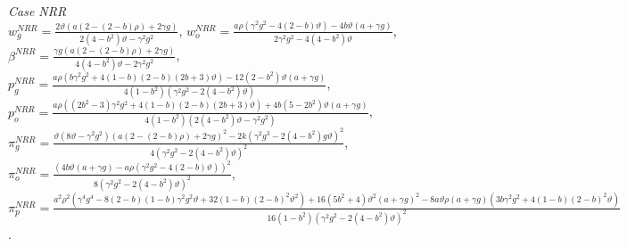 \documentclass[preprint,review,12pt,authoryear,nopreprintline]{elsarticle}
\theoremstyle{definition}
\begin{document}
\noindent\textit{Case NRR}\\
$w_g^{NRR}=\frac{2 \vartheta  (a (2-(2-b) \rho )+2 \gamma  g)}{2 \left(4-b^2\right) \vartheta -\gamma ^2 g^2}$,
$w_o^{NRR}=\frac{a \rho  \left(\gamma ^2 g^2-4 (2-b) \vartheta \right)-4 b \vartheta  (a+\gamma  g)}{2 \gamma ^2 g^2-4 \left(4-b^2\right) \vartheta }$,
$\beta^{NRR}=\frac{\gamma  g (a (2-(2-b) \rho )+2 \gamma  g)}{4 \left(4-b^2\right) \vartheta -2 \gamma ^2 g^2}$,\\
$p_g^{NRR}=\frac{a \rho  \left(b \gamma ^2 g^2+4 (1-b) (2-b) (2 b+3) \vartheta \right)-12 \left(2-b^2\right) \vartheta  (a+\gamma  g)}{4 \left(1-b^2\right) \left(\gamma ^2 g^2-2 \left(4-b^2\right) \vartheta \right)}$,\\
$p_o^{NRR}=\frac{a \rho  \left(\left(2 b^2-3\right) \gamma ^2 g^2+4 (1-b) (2-b) (2 b+3) \vartheta \right)+4 b \left(5-2 b^2\right) \vartheta  (a+\gamma  g)}{4 \left(1-b^2\right) \left(2 \left(4-b^2\right) \vartheta -\gamma ^2 g^2\right)}$,\\
$\pi_g^{NRR}=\frac{\vartheta  \left(8 \vartheta -\gamma ^2 g^2\right) (a (2-(2-b) \rho )+2 \gamma  g)^2-2 k \left(\gamma ^2 g^3-2 \left(4-b^2\right) g \vartheta \right)^2}{4 \left(\gamma ^2 g^2-2 \left(4-b^2\right) \vartheta \right)^2}$,
$\pi_o^{NRR}=\frac{\left(4 b \vartheta  (a+\gamma  g)-a \rho  \left(\gamma ^2 g^2-4 (2-b) \vartheta \right)\right)^2}{8 \left(\gamma ^2 g^2-2 \left(4-b^2\right) \vartheta \right)^2}$,\\
$\pi_p^{NRR}=\frac{a^2 \rho ^2 \left(\gamma ^4 g^4-8 (2-b) (1-b) \gamma ^2 g^2 \vartheta +32 (1-b) (2-b)^2 \vartheta ^2\right)+16 \left(5 b^2+4\right) \vartheta ^2 (a+\gamma  g)^2-8 a \vartheta  \rho  (a+\gamma  g) \left(3 b \gamma ^2 g^2+4 (1-b) (2-b)^2 \vartheta \right)}{16 \left(1-b^2\right) \left(\gamma ^2 g^2-2 \left(4-b^2\right) \vartheta \right)^2}$.
\end{document}
